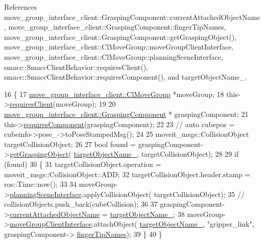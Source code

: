 References move\+\_\+group\+\_\+interface\+\_\+client\+::\+Grasping\+Component\+::current\+Attached\+Object\+Name, move\+\_\+group\+\_\+interface\+\_\+client\+::\+Grasping\+Component\+::finger\+Tip\+Names, move\+\_\+group\+\_\+interface\+\_\+client\+::\+Grasping\+Component\+::get\+Grasping\+Object(), move\+\_\+group\+\_\+interface\+\_\+client\+::\+Cl\+Move\+Group\+::move\+Group\+Client\+Interface, move\+\_\+group\+\_\+interface\+\_\+client\+::\+Cl\+Move\+Group\+::planning\+Scene\+Interface, smacc\+::\+Smacc\+Client\+Behavior\+::requires\+Client(), smacc\+::\+Smacc\+Client\+Behavior\+::requires\+Component(), and target\+Object\+Name\+\_\+.


\begin{DoxyCode}
16     \{
17         \hyperlink{classmove__group__interface__client_1_1ClMoveGroup}{move\_group\_interface\_client::ClMoveGroup} *moveGroup;
18         this->\hyperlink{classsmacc_1_1SmaccClientBehavior_a917f001e763a1059af337bf4e164f542}{requiresClient}(moveGroup);
19 
20         \hyperlink{classmove__group__interface__client_1_1GraspingComponent}{move\_group\_interface\_client::GraspingComponent} *
      graspingComponent;
21         this->\hyperlink{classsmacc_1_1SmaccClientBehavior_adee6abe3a28aa6b47d3dd5267e264b4d}{requiresComponent}(graspingComponent);
22 
23         \textcolor{comment}{// auto cubepos = cubeinfo->pose\_->toPoseStampedMsg();}
24 
25         moveit\_msgs::CollisionObject targetCollisionObject;
26 
27         \textcolor{keywordtype}{bool} found = graspingComponent->\hyperlink{classmove__group__interface__client_1_1GraspingComponent_ad3b8583ead160cf3fca89809c9880f1e}{getGraspingObject}(
      \hyperlink{classmove__group__interface__client_1_1CbAttachObject_a3d2591373f673a8479025044138bd82b}{targetObjectName\_}, targetCollisionObject);
28 
29         \textcolor{keywordflow}{if} (found)
30         \{
31             targetCollisionObject.operation = moveit\_msgs::CollisionObject::ADD;
32             targetCollisionObject.header.stamp = ros::Time::now();
33 
34             moveGroup->\hyperlink{classmove__group__interface__client_1_1ClMoveGroup_a401213ca52233581d2a659dbb772720c}{planningSceneInterface}.applyCollisionObject(
      targetCollisionObject);
35             \textcolor{comment}{// collisionObjects.push\_back(cubeCollision);}
36 
37             graspingComponent->\hyperlink{classmove__group__interface__client_1_1GraspingComponent_aa1098467cb6a739228c3ed1a3f66c095}{currentAttachedObjectName} = 
      \hyperlink{classmove__group__interface__client_1_1CbAttachObject_a3d2591373f673a8479025044138bd82b}{targetObjectName\_};
38             moveGroup->\hyperlink{classmove__group__interface__client_1_1ClMoveGroup_a5f0ea9b52695661b17605691168d1f31}{moveGroupClientInterface}.attachObject(
      \hyperlink{classmove__group__interface__client_1_1CbAttachObject_a3d2591373f673a8479025044138bd82b}{targetObjectName\_}, \textcolor{stringliteral}{"gripper\_link"}, graspingComponent->
      \hyperlink{classmove__group__interface__client_1_1GraspingComponent_a31afa10c937b168174e02d322a300c4d}{fingerTipNames});
39         \}
40     \}
\end{DoxyCode}

